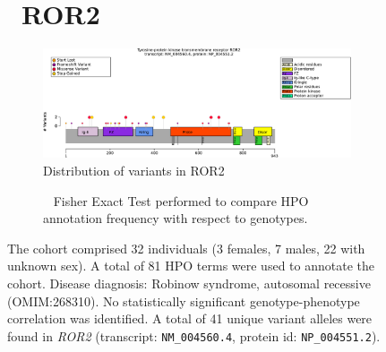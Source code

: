 \begin{figure}[htbp]
    \section*{ ROR2}
    \centering
    \begin{subfigure}[b]{0.95\textwidth}
    \centering
    \includegraphics[width=\textwidth]{ img/ROR2_protein_diagram.pdf} 
    \captionsetup{justification=raggedright,singlelinecheck=false}
    \caption{Distribution of variants in ROR2}
    \end{subfigure}
    
    \vspace{2em}
    
    \begin{subfigure}[b]{0.95\textwidth}
    \centering
    \captionsetup{justification=raggedright,singlelinecheck=false}
    \caption{             Fisher Exact Test performed to compare HPO annotation frequency with respect to genotypes. }
    \end{subfigure}
    
    \vspace{2em}
    
    \caption{ The cohort comprised 32 individuals (3 females, 7 males, 22 with unknown sex). A total of 81 HPO terms were used to annotate the cohort. Disease diagnosis: Robinow syndrome, autosomal recessive (OMIM:268310). No statistically significant genotype-phenotype correlation was identified. A total of 41 unique variant alleles were found in \textit{ROR2} (transcript: \texttt{NM\_004560.4}, protein id: \texttt{NP\_004551.2}).}
    \end{figure}
    
